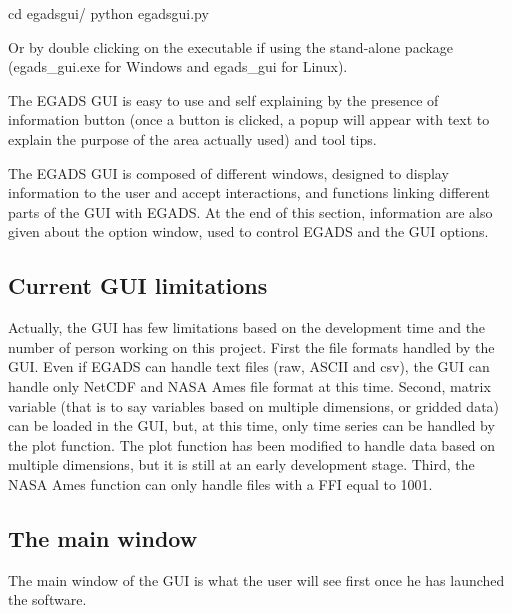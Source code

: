 \documentclass[a4paper,10pt,openany,english]{sphinxmanual}
\let\sphinxpxdimen\pdfpxdimen\else\newdimen\sphinxpxdimen
\begin{document}
%
\begin{sphinxVerbatim}[commandchars=\\\{\}]
\PYGZdl{} cd egads\PYGZus{}gui/
\PYGZdl{} python egads\PYGZus{}gui.py
\end{sphinxVerbatim}

Or by double clicking on the executable if using the stand-alone package (egads\_gui.exe for Windows and egads\_gui for Linux).

The EGADS GUI is easy to use and self explaining by the presence of information button (once a button is clicked, a popup will appear with text to explain the purpose of the area actually used) and tool tips.

The EGADS GUI is composed of different windows, designed to display information to the user and accept interactions, and functions linking different parts of the GUI with EGADS. At the end of this section, information are also given about the option window, used to control EGADS and the GUI options.


\subsection{Current GUI limitations}
\label{\detokenize{description:current-gui-limitations}}
Actually, the GUI has few limitations based on the development time and the number of person working on this project. First the file formats handled by the GUI. Even if EGADS can handle text files (raw, ASCII and csv), the GUI can handle only NetCDF and NASA Ames file format at this time. Second, matrix variable (that is to say variables based on multiple dimensions, or gridded data) can be loaded in the GUI, but, at this time, only time series can be handled by the plot function. The plot function has been modified to handle data based on multiple dimensions, but it is still at an early development stage. Third, the NASA Ames function can only handle files with a FFI equal to 1001.


\subsection{The main window}
\label{\detokenize{description:the-main-window}}
The main window of the GUI is what the user will see first once he has launched the software.

\noindent{\hspace*{\fill}\scalebox{0.450000}{\sphinxincludegraphics[width=936\sphinxpxdimen,height=647\sphinxpxdimen]{{EGADS_GUI_000}.png}}\hspace*{\fill}}
\end{document}
